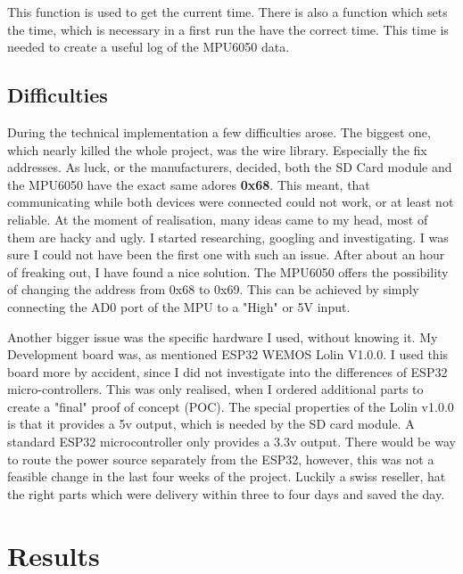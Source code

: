 This function is used to get the current time. There is also a function which sets the time, which is necessary in a first run the have the correct time. This time is needed to create a useful log of the MPU6050 data.

\subsection{Difficulties}

During the technical implementation a few difficulties arose. The biggest one, which nearly killed the whole project, was the wire library. Especially the fix addresses. As luck, or the manufacturers, decided, both the SD Card module and the MPU6050 have the exact same adores \textbf{0x68}. This meant, that communicating while both devices were connected could not work, or at least not reliable. At the moment of realisation, many ideas came to my head, most of them are hacky and ugly. I started researching, googling and investigating. I was sure I could not have been the first one with such an issue. After about an hour of freaking out, I have found a nice solution. 
The MPU6050 offers the possibility of changing the address from 0x68 to 0x69. This can be achieved by simply connecting the AD0 port of the MPU to a "High" or 5V input.

Another bigger issue was the specific hardware I used, without knowing it. My Development board was, as mentioned ESP32 WEMOS Lolin V1.0.0. I used this board more by accident, since I did not investigate into the differences of ESP32 micro-controllers. This was only realised, when I ordered additional parts to create a "final" proof of concept (POC). The special properties of the Lolin v1.0.0 is that it provides a 5v output, which is needed by the SD card module. A standard ESP32 microcontroller only provides a 3.3v output. There would be way to route the power source separately from the ESP32, however, this was not a feasible change in the last four weeks of the project. Luckily a swiss reseller, hat the right parts which were delivery within three to four days and saved the day.
\newpage
\section{Results}

